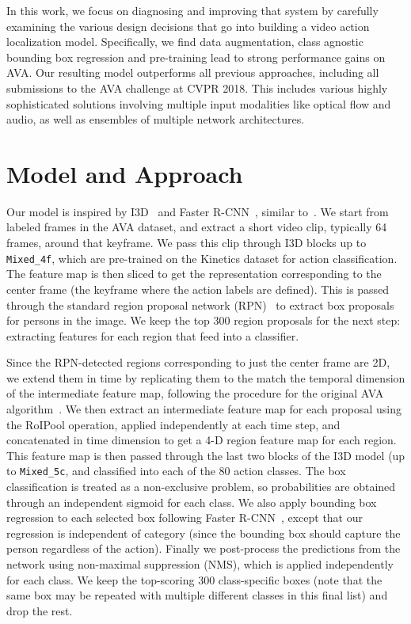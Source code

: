 \documentclass{article}
\begin{document}
  In this work, we focus on diagnosing and improving that system by carefully examining the various design decisions that go into building a video action localization model. Specifically, we find data augmentation, class agnostic bounding box regression and pre-training lead to strong performance gains on AVA. Our resulting model outperforms all previous approaches, including all submissions to the AVA challenge at CVPR 2018. This includes various highly sophisticated solutions involving multiple input modalities like optical flow and audio, as well as ensembles of multiple network architectures.



\section{Model and Approach}

  Our model is inspired by I3D~\cite{carreira2017quo} and Faster R-CNN~\cite{ren2015faster}, similar to~\cite{girdhar2018detecttrack,hou2017tube}.
  We start from labeled frames in the AVA dataset, and extract a short video clip, typically 64 frames, around that keyframe. 
  We pass this clip through I3D blocks up to {\tt Mixed\_4f}, which are pre-trained on the Kinetics dataset for action classification.
  The feature map is then sliced to get the representation corresponding to the center frame (the keyframe where the action labels are defined). 
  This is passed through the standard region proposal network (RPN)~\cite{ren2015faster} to extract box proposals for persons in the image. 
  We keep the top 300 region proposals for the next step: extracting features for each region that feed into a classifier.

  Since the RPN-detected regions corresponding to just the center frame are 2D, we extend them in time by replicating them to the match the temporal dimension of the intermediate feature map, following the procedure for the original AVA algorithm~\cite{gu2017ava}. 
  We then extract an intermediate feature map for each proposal using the RoIPool operation, applied independently at each time step, and concatenated in time dimension to get a 4-D region feature map for each region.
  This feature map is then passed through the last two blocks of the I3D model (up to {\tt Mixed\_5c}, and classified into each of the 80 action classes.
  The box classification is treated as a non-exclusive problem, so probabilities are obtained through an independent sigmoid for each class.
  We also apply bounding box regression to each selected box following Faster R-CNN~\cite{ren2015faster}, except that our regression is independent of category (since the bounding box should capture the person regardless of the action).
  Finally we post-process the predictions from the network using non-maximal suppression (NMS), which is applied independently for each class. 
  We keep the top-scoring 300 class-specific boxes (note that the same box may be repeated with multiple different classes in this final list) and drop the rest.
\end{document}
